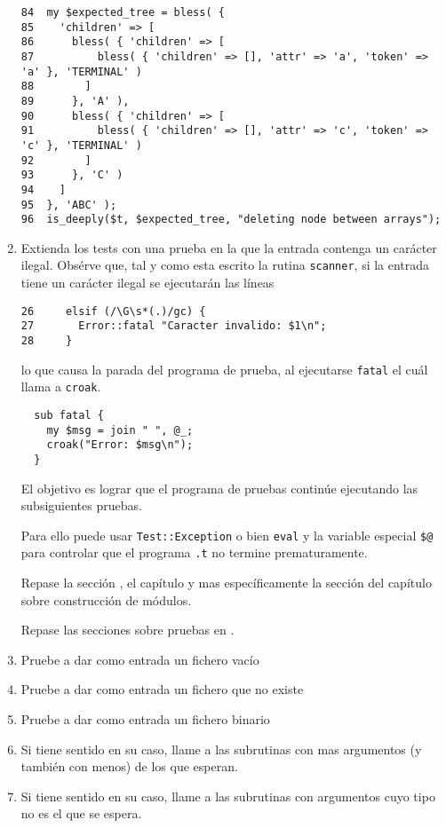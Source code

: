 \begin{enumerate}
\begin{verbatim}
84  my $expected_tree = bless( {
85    'children' => [
86      bless( { 'children' => [
87          bless( { 'children' => [], 'attr' => 'a', 'token' => 'a' }, 'TERMINAL' )
88        ]
89      }, 'A' ),
90      bless( { 'children' => [
91          bless( { 'children' => [], 'attr' => 'c', 'token' => 'c' }, 'TERMINAL' )
92        ]
93      }, 'C' )
94    ]
95  }, 'ABC' );
96  is_deeply($t, $expected_tree, "deleting node between arrays");
\end{verbatim}

\item
Extienda los tests con una prueba en la que la entrada contenga un carácter ilegal.
Obsérve que, tal y como esta escrito la rutina \verb|scanner|,
si la entrada tiene un carácter ilegal se ejecutarán las líneas 
\begin{verbatim}
26     elsif (/\G\s*(.)/gc) {
27       Error::fatal "Caracter invalido: $1\n";
28     }
\end{verbatim}
lo que causa la parada del programa 
de prueba,
al ejecutarse \verb|fatal| el cuál llama a \verb|croak|.
\begin{verbatim}
  sub fatal {
    my $msg = join " ", @_;
    croak("Error: $msg\n");
  }
\end{verbatim}
El objetivo es lograr que el programa de pruebas continúe ejecutando las subsiguientes 
pruebas.

Para ello puede usar \verb|Test::Exception| 
o bien \verb|eval| y la variable especial \verb|$@| para controlar que el
programa \verb|.t| no termine prematuramente.
\begin{htmlonly}
Repase la sección ,
el capítulo 
 y mas específicamente la sección
 del capítulo sobre construcción de módulos.
\end{htmlonly}
\begin{latexonly}
Repase las secciones sobre pruebas en \cite{CasianoIntroAPerl}.
\end{latexonly}

\item
Pruebe a dar como entrada un fichero vacío
\item
Pruebe a dar como entrada un fichero que no existe
\item
Pruebe a dar como entrada un fichero binario
\item
Si tiene sentido en su caso, llame a las subrutinas con mas argumentos (y también con menos) de los que esperan.
\item
Si tiene sentido en su caso, llame a las subrutinas con argumentos cuyo tipo no es el que se espera.


\end{enumerate}
